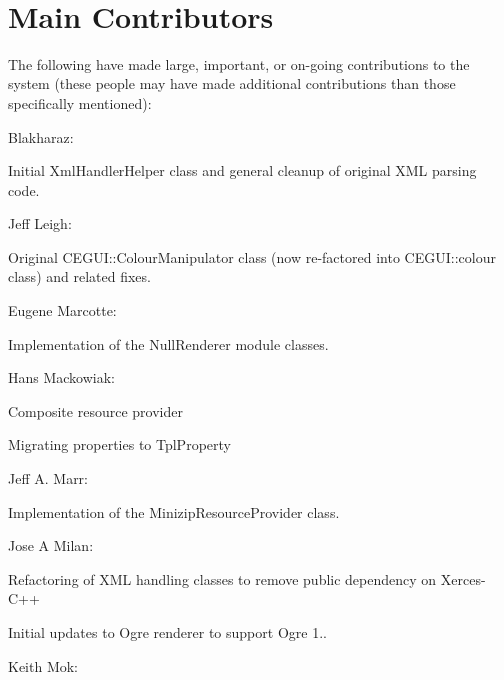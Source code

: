 ~\newline
 \hypertarget{authors_authors_sec_4}{}\section{Main Contributors}\label{authors_authors_sec_4}
The following have made large, important, or on-\/going contributions to the system (these people may have made additional contributions than those specifically mentioned)\+:
\begin{DoxyItemize}
\item \textquotesingle{}Blakharaz\textquotesingle{}\+:
\begin{DoxyItemize}
\item Initial Xml\+Handler\+Helper class and general cleanup of original X\+ML parsing code.
\end{DoxyItemize}
\item Jeff Leigh\+:
\begin{DoxyItemize}
\item Original C\+E\+G\+U\+I\+::\+Colour\+Manipulator class (now re-\/factored into C\+E\+G\+U\+I\+::colour class) and related fixes.
\end{DoxyItemize}
\item Eugene Marcotte\+:
\begin{DoxyItemize}
\item Implementation of the Null\+Renderer module classes.
\end{DoxyItemize}
\item Hans Mackowiak\+:
\begin{DoxyItemize}
\item Composite resource provider
\item Migrating properties to Tpl\+Property
\end{DoxyItemize}
\item Jeff A. Marr\+:
\begin{DoxyItemize}
\item Implementation of the Minizip\+Resource\+Provider class.
\end{DoxyItemize}
\item Jose A Milan\+:
\begin{DoxyItemize}
\item Refactoring of X\+ML handling classes to remove public dependency on Xerces-\/\+C++
\item Initial updates to Ogre renderer to support Ogre 1..
\end{DoxyItemize}
\item Keith Mok\+:

\end{DoxyItemize}
